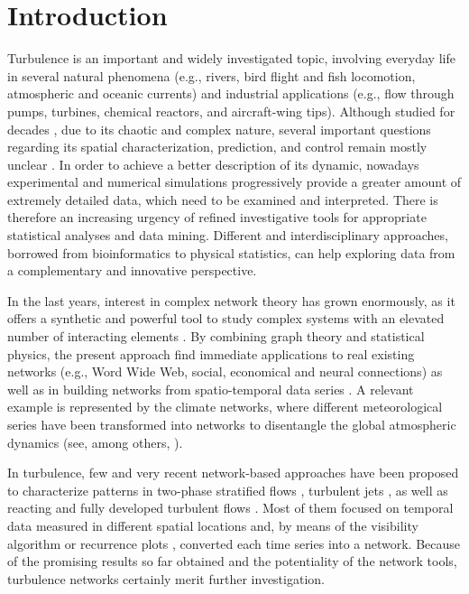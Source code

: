 \documentclass{ws-ijbc}
\begin{document}

\section{Introduction}

Turbulence is an important and widely investigated topic, involving everyday life in several natural phenomena (e.g., rivers, bird flight and fish locomotion, atmospheric and oceanic currents) and industrial applications (e.g., flow through pumps, turbines, chemical reactors, and aircraft-wing tips). Although studied for decades \cite{Frisch}, due to its chaotic and complex nature, several important questions regarding its spatial characterization, prediction, and control remain mostly unclear \cite{Warhaft}. In order to achieve a better description of its dynamic, nowadays experimental and numerical simulations progressively provide a greater amount of extremely detailed data, which need to be examined and interpreted. There is therefore an increasing urgency of refined investigative tools for appropriate statistical analyses and data mining. Different and interdisciplinary approaches, borrowed from bioinformatics to physical statistics, can help exploring data from a complementary and innovative perspective.

In the last years, interest in complex network theory has grown enormously, as it offers a synthetic and powerful tool to study complex systems with an elevated number of interacting elements \cite{albert_barabasi_2002,WS1998,newman2010}. By combining graph theory and statistical physics, the present approach find immediate applications to real existing networks (e.g., Word Wide Web, social, economical and neural connections) as well as in building networks from spatio-temporal data series \cite{costa_et_al_2011,Boccaletti2006}. A relevant example is represented by the climate networks, where different meteorological series have been transformed into networks to disentangle the global atmospheric dynamics (see, among others, \cite{Yamasaki_et_al_2008,steinhaeuser_et_al_2012,scarsoglio2013,sivakumar2014,tsonis_et_al_2008,Donges_et_al_2009}).

In turbulence, few and very recent network-based approaches have been proposed to characterize patterns in two-phase stratified flows \cite{gaojin2009,Gao2013,Gao2015exp,gao2015,Gao2015SciRep,gao2015epl,Gao2016}, turbulent jets \cite{shirazi,Charakopoulos}, as well as reacting \cite{Murugesan} and fully developed turbulent flows \cite{Liu,manshour}. Most of them focused on temporal data measured in different spatial locations and, by means of the visibility algorithm \cite{Lacasa} or recurrence plots \cite{Donner,Marwan}, converted each time series into a network. Because of the promising results so far obtained and the potentiality of the network tools, turbulence networks certainly merit further investigation.
\end{document}
